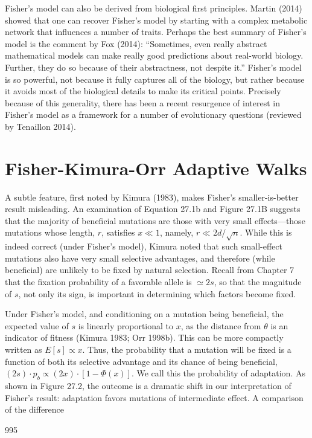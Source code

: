\documentclass{article}
\begin{document}
Fisher’s model can also be derived from biological first principles. Martin (2014) showed that one can recover Fisher’s model by starting with a complex metabolic network that influences a number of traits. Perhaps the best summary of Fisher’s model is the comment by Fox (2014): “Sometimes, even really abstract mathematical models can make really good predictions about real-world biology. Further, they do so because of their abstractness, not despite it.” Fisher’s model is so powerful, not because it fully captures all of the biology, but rather because it avoids most of the biological details to make its critical points. Precisely because of this generality, there has been a recent resurgence of interest in Fisher’s model as a framework for a number of evolutionary questions (reviewed by Tenaillon 2014).

\section{Fisher-Kimura-Orr Adaptive Walks}
A subtle feature, first noted by Kimura (1983), makes Fisher's smaller-is-better result misleading. An examination of Equation 27.1b and Figure 27.1B suggests that the majority of beneficial mutations are those with very small effects—those mutations whose length, $r$, satisfies $x \ll 1$, namely, $r \ll 2d/\sqrt{n}$. While this is indeed correct (under Fisher's model), Kimura noted that such small-effect mutations also have very small selective advantages, and therefore (while beneficial) are unlikely to be fixed by natural selection. Recall from Chapter 7 that the fixation probability of a favorable allele is $\simeq 2s$, so that the magnitude of $s$, not only its sign, is important in determining which factors become fixed.

Under Fisher’s model, and conditioning on a mutation being beneficial, the expected value of $s$ is linearly proportional to $x$, as the distance from $\theta$ is an indicator of fitness (Kimura 1983; Orr 1998b). This can be more compactly written as $E[s] \propto x$. Thus, the probability that a mutation will be fixed is a function of both its selective advantage and its chance of being beneficial, $(2s) \cdot p_b \propto (2x) \cdot [1 - \Phi(x)]$. We call this the probability of adaptation. As shown in Figure 27.2, the outcome is a dramatic shift in our interpretation of Fisher’s result: adaptation favors mutations of intermediate effect. A comparison of the difference

995
\end{document}

